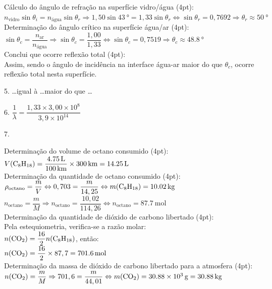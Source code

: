 \documentclass{article}
\begin{document}
				Cálculo do ângulo de refração na superfície vidro/água (4pt):\\
				$n_\text{vidro} \sin \theta_i = n_\text{água} \sin \theta_r \Rightarrow 1,50 \sin \SI{43}{\degree} = 1,33 \sin \theta_r \Leftrightarrow \sin \theta_r = 0,7692 \Rightarrow \theta_r \approx \SI{50}{\degree}$\\[8pt]
				Determinação do ângulo crítico na superfície água/ar (4pt):\\
				$\sin \theta_c = \dfrac{n_\text{ar}}{n_\text{água}} \Rightarrow \sin \theta_c = \dfrac{1,00}{1,33} \Leftrightarrow \sin \theta_c = 0,7519 \Rightarrow \theta_c \approx \SI{48,8}{\degree}$\\[8pt]
				Conclui que ocorre reflexão total (4pt):\\
				Assim, sendo o ângulo de incidência na interface água-ar maior do que $\theta_c$, ocorre reflexão total nesta superfície.

\vspace{20pt}
5. \ldots igual à \ldots maior do que \ldots

\vspace{20pt}
6. 
 $\dfrac{1}{\lambda} = \dfrac{1,33 \times 3,00 \times 10^8}{3,9 \times 10^{14}}$

\vspace{20pt}
7.

			Determinação do volume de octano consumido (4pt):\\
			$V(\ce{C8H18})= \dfrac{\SI{4,75}{\liter}}{\SI{100}{\kilo\meter}} \times \SI{300}{\kilo\meter} = \SI{14,25}{\liter}$ \\[8pt]
			Determinação da quantidade de octano consumido (4pt):\\
			$\rho_\text{octano} = \dfrac{m}{V} \Leftrightarrow 0,703 = \dfrac{m}{14,25} \Leftrightarrow m(\ce{C8H18}) = \SI{10,02}{\kilogram} $\\
			$n_\text{octano} = \dfrac{m}{M} \Rightarrow n_\text{octano} = \dfrac{10,02}{114,26} \Leftrightarrow n_\text{octano} = \SI{87,7}{\mole}$\\[8pt]
			Determinação da quantidade de dióxido de carbono libertado (4pt):\\
			Pela estequiometria, verifica-se a razão molar:\\
			$n(\ce{CO2}) = \dfrac{16}{2} n(\ce{C8H18})$, então:\\
			$n(\ce{CO2}) = \dfrac{16}{2} \times 87,7 = \SI{701,6}{\mole}$\\[8pt]
			Determinação da massa de dióxido de carbono libertado para a atmosfera (4pt):\\
			$n(\ce{CO2}) = \dfrac{m}{M} \Rightarrow 701,6 = \dfrac{m}{44,01} \Leftrightarrow m(\ce{CO2}) = \SI{30,88e3}{\gram} = \SI{30,88}{\kilogram}$
\end{document}

